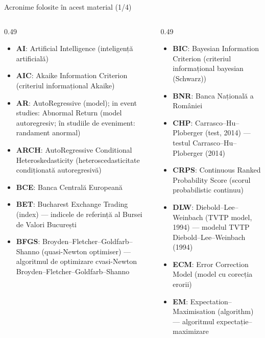 \begin{frame}{Acronime folosite în acest material (1/4)}
\begin{columns}[T]
\begin{column}{0.49\textwidth}
\begin{itemize}\setlength{\itemsep}{0pt}
    \item \textbf{AI}: Artificial Intelligence (inteligență artificială)
    \item \textbf{AIC}: Akaike Information Criterion (criteriul informațional Akaike)
    \item \textbf{AR}: AutoRegressive (model); in event studies: Abnormal Return (model autoregresiv; în studiile de eveniment: randament anormal)
    \item \textbf{ARCH}: AutoRegressive Conditional Heteroskedasticity (heteroscedasticitate condiționată autoregresivă)
    \item \textbf{BCE}: Banca Centrală Europeană
    \item \textbf{BET}: Bucharest Exchange Trading (index) — indicele de referință al Bursei de Valori București
    \item \textbf{BFGS}: Broyden–Fletcher–Goldfarb–Shanno (quasi-Newton optimiser) — algoritmul de optimizare cvasi-Newton Broyden–Fletcher–Goldfarb–Shanno
\end{itemize}
\end{column}
\begin{column}{0.49\textwidth}
\begin{itemize}\setlength{\itemsep}{0pt}
    \item \textbf{BIC}: Bayesian Information Criterion (criteriul informațional bayesian (Schwarz))
    \item \textbf{BNR}: Banca Națională a României
    \item \textbf{CHP}: Carrasco–Hu–Ploberger (test, 2014) — testul Carrasco–Hu–Ploberger (2014)
    \item \textbf{CRPS}: Continuous Ranked Probability Score (scorul probabilistic continuu)
    \item \textbf{DLW}: Diebold–Lee–Weinbach (TVTP model, 1994) — modelul TVTP Diebold–Lee–Weinbach (1994)
    \item \textbf{ECM}: Error Correction Model (model cu corecția erorii)
    \item \textbf{EM}: Expectation–Maximisation (algorithm) — algoritmul expectație–maximizare
\end{itemize}
\end{column}
\end{columns}
\end{frame}
